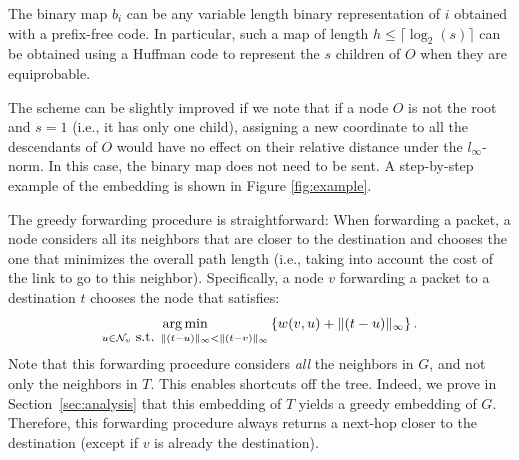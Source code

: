 \documentclass[conference]{IEEEtran}
\def\argmin{\mathop{\rm arg\,min}}
\def\cN{\mathcal{N}}
\begin{document}
The binary map $b_i$ can be any variable length binary representation of $i$ obtained with a prefix-free code. In particular, such a map of length $h \leq \lceil \log_2 (s) \rceil$ can be obtained using a Huffman code to represent the $s$ children of $O$ when they are equiprobable.

The scheme can be slightly improved if we note that if a node $O$ is not the root and $s=1$ (i.e., it has only one child), assigning a new coordinate to all the descendants of $O$ would have no effect on their relative distance under the $l_\infty$-norm. In this case, the binary map does not need to be sent. A step-by-step example of the embedding is shown in Figure \ref{fig:example}.

The greedy forwarding procedure is straightforward: When forwarding a packet, a node considers all its neighbors that are closer to the destination and chooses the one that minimizes the overall path length (i.e., taking into account the cost of the link to go to this neighbor). Specifically, a node $v$ forwarding a packet to a destination $t$ chooses the node that satisfies:
\begin{eqnarray}
\argmin_{u \in \cN_v \mbox{ s.t. } \lVert (t-u)  \rVert_\infty < \lVert (t-v)  \rVert_\infty} \left\{ w(v,u) +  \lVert (t-u)  \rVert_\infty \right\}.
\label{eq:forwardcost}
\nonumber
\end{eqnarray}
Note that this forwarding procedure considers \emph{all} the neighbors in $G$, and not only the neighbors in $T$. This enables shortcuts off the tree.
Indeed,
we prove in Section~\ref{sec:analysis} that this embedding of $T$ yields a greedy embedding of $G$. Therefore, this forwarding procedure always returns a next-hop closer to the destination (except if $v$ is already the destination).
\end{document}
